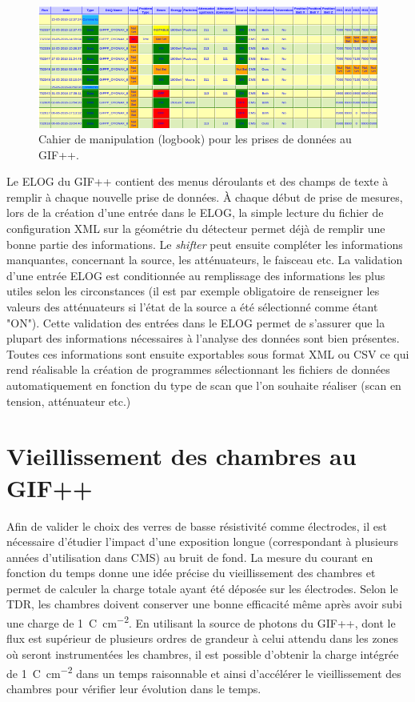 \begin{figure}[!ht]
	\centering
	\includegraphics[width=0.75\linewidth]{GLA/ELOG2.png}
	\caption{Cahier de manipulation (logbook) pour les prises de données au GIF++.}
	\label{ELOG}
\end{figure}

Le ELOG du GIF++ contient des menus déroulants et des champs de texte à remplir à chaque nouvelle prise de données. À chaque début de prise de mesures, lors de la création d'une entrée dans le ELOG, la simple lecture du fichier de configuration XML sur la géométrie du détecteur permet déjà de remplir une bonne partie des informations. Le \textit{shifter} peut ensuite compléter les informations manquantes, concernant la source, les atténuateurs, le faisceau etc. La validation d'une entrée ELOG est conditionnée au remplissage des informations les plus utiles selon les circonstances (il est par exemple obligatoire de renseigner les valeurs des atténuateurs si l'état de la source a été sélectionné comme étant "ON"). Cette validation des entrées dans le ELOG permet de s'assurer que la plupart des informations nécessaires à l'analyse des données sont bien présentes. Toutes ces informations sont ensuite exportables sous format XML ou CSV ce qui rend réalisable la création de programmes sélectionnant les fichiers de données automatiquement en fonction du type de scan que l'on souhaite réaliser (scan en tension, atténuateur etc.)
\vspace*{-0.2cm}
\section{Vieillissement des chambres au GIF++}
\label{VIEE}
\vspace*{-0.4cm}
Afin de valider le choix des verres de basse résistivité comme électrodes, il est nécessaire d'étudier l'impact d'une exposition longue (correspondant à plusieurs années d'utilisation dans CMS) au bruit de fond. La mesure du courant en fonction du temps donne une idée précise du vieillissement des chambres et permet de calculer la charge totale ayant été déposée sur les électrodes. Selon le TDR, les chambres doivent conserver une bonne efficacité même après avoir subi une charge de \SI{1}{\coulomb\per\square\centi\meter}. En utilisant la source de photons du GIF++, dont le flux est supérieur de plusieurs ordres de grandeur à celui attendu dans les zones où seront instrumentées les chambres, il est possible d'obtenir la charge intégrée de \SI{1}{\coulomb\per\square\centi\meter} dans un temps raisonnable et ainsi d'accélérer le vieillissement des chambres pour vérifier leur évolution dans le temps.

